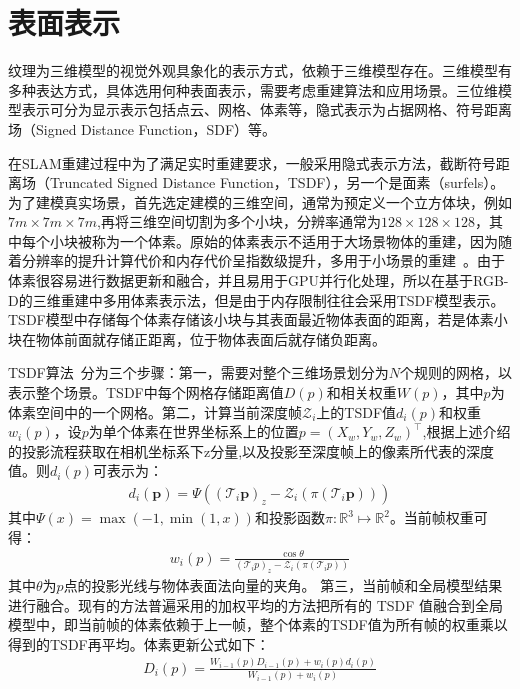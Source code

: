 \section{表面表示}
纹理为三维模型的视觉外观具象化的表示方式，依赖于三维模型存在。三维模型有多种表达方式，具体选用何种表面表示，需要考虑重建算法和应用场景。三位维模型表示可分为显示表示包括点云、网格、体素等，隐式表示为占据网格、符号距离场（Signed Distance Function，SDF）等。\par
在SLAM重建过程中为了满足实时重建要求，一般采用隐式表示方法，截断符号距离场（Truncated Signed Distance Function，TSDF），另一个是面素（surfels）。为了建模真实场景，首先选定建模的三维空间，通常为预定义一个立方体块，例如$7m \times 7m \times 7m$,再将三维空间切割为多个小块，分辨率通常为$128 \times 128 \times 128$，其中每个小块被称为一个体素。原始的体素表示不适用于大场景物体的重建，因为随着分辨率的提升计算代价和内存代价呈指数级提升，多用于小场景的重建~\cite{nguyen2018rendernet}。由于体素很容易进行数据更新和融合，并且易用于GPU并行化处理，所以在基于RGB-D的三维重建中多用体素表示法，但是由于内存限制往往会采用TSDF模型表示。TSDF模型中存储每个体素存储该小块与其表面最近物体表面的距离，若是体素小块在物体前面就存储正距离，位于物体表面后就存储负距离。\par
TSDF算法~\cite{BrianCurless1996AVM}分为三个步骤：第一，需要对整个三维场景划分为$N$个规则的网格，以表示整个场景。TSDF中每个网格存储距离值$D(p)$和相关权重$W(p)$，其中$p$为体素空间中的一个网格。第二，计算当前深度帧$\mathcal{Z}_{i}$上的TSDF值$d_i(p)$和权重$w_i(p)$，设$p$为单个体素在世界坐标系上的位置$p = (X_w,Y_w,Z_w)^\top$,根据上述介绍的投影流程获取在相机坐标系下z分量,以及投影至深度帧上的像素所代表的深度值。则$d_i(p)$可表示为：
\begin{align}
d_{i}(\boldsymbol{p})=\Psi\left(\left(\mathcal{T}_{i} \boldsymbol{p}\right)_{z}-\mathcal{Z}_{i}\left(\pi\left(\mathcal{T}_{i} \boldsymbol{p}\right)\right)\right) 
\end{align}
其中$\Psi(x) =\max \left(-1, \min \left(1, x\right)\right)$和投影函数$ \pi: \mathbb{R}^{3} \mapsto \mathbb{R}^{2}$。当前帧权重可得：
\begin{align}
w_i(p) = \frac{ \cos \theta} { \left(\mathcal{T}_{i} p\right)_{z}-\mathcal{Z}_{i}\left(\pi\left(\mathcal{T}_{i}p\right)\right)} 
\end{align}其中$\theta$为$p$点的投影光线与物体表面法向量的夹角。
第三，当前帧和全局模型结果进行融合。现有的方法普遍采用的加权平均的方法把所有的 TSDF 值融合到全局模型中，即当前帧的体素依赖于上一帧，整个体素的TSDF值为所有帧的权重乘以得到的TSDF再平均。体素更新公式如下：
\begin{align}
D_{i}(p)=\frac{W_{i-1}(p) D_{i-1}(p)+w_{i}(p) d_{i}(p)}{W_{i-1}(p)+w_{i}(p)} 
\end{align}

